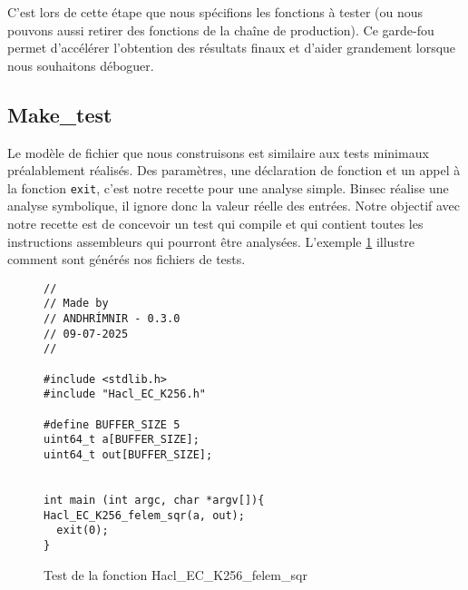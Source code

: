 C'est lors de cette étape que nous spécifions les fonctions à tester (ou nous pouvons aussi retirer des fonctions de la chaîne de production). Ce garde-fou permet d'accélérer l'obtention des résultats finaux et d'aider grandement lorsque nous souhaitons déboguer.

\subsection*{Make\_test}

Le modèle de fichier que nous construisons est similaire aux tests minimaux préalablement réalisés. Des paramètres, une déclaration de fonction et un appel à la fonction \texttt{exit}, c'est notre recette pour une analyse simple. Binsec réalise une analyse symbolique, il ignore donc la valeur réelle des entrées. Notre objectif avec notre recette est de concevoir un test qui compile et qui contient toutes les instructions assembleurs qui pourront être analysées. L'exemple \ref{fig:gen_test_simple} illustre comment sont générés nos fichiers de tests.\medbreak

\begin{figure}[!ht]
  \caption{Test de la fonction Hacl\_EC\_K256\_felem\_sqr}
  \label{fig:gen_test_simple}
  \begin{verbatim}
//
// Made by
// ANDHRÍMNIR - 0.3.0
// 09-07-2025
//

#include <stdlib.h>
#include "Hacl_EC_K256.h"

#define BUFFER_SIZE 5
uint64_t a[BUFFER_SIZE];
uint64_t out[BUFFER_SIZE];


int main (int argc, char *argv[]){
Hacl_EC_K256_felem_sqr(a, out);
  exit(0);
}   
  \end{verbatim}

\end{figure}

